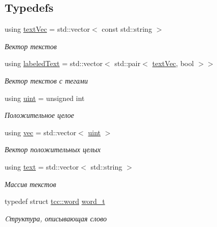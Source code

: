 \subsection*{Typedefs}
\begin{DoxyCompactItemize}
\item 
using \hyperlink{namespacetcc_a9bdf9e81347b7904a6a7f8427d6465dc}{text\+Vec} = std\+::vector$<$ const std\+::string $>$\hypertarget{namespacetcc_a9bdf9e81347b7904a6a7f8427d6465dc}{}\label{namespacetcc_a9bdf9e81347b7904a6a7f8427d6465dc}

\begin{DoxyCompactList}\small\item\em Вектор текстов \end{DoxyCompactList}\item 
using \hyperlink{namespacetcc_a9822983deb4f2a8719352b3c1c55d69a}{labeled\+Text} = std\+::vector$<$ std\+::pair$<$ \hyperlink{namespacetcc_a9bdf9e81347b7904a6a7f8427d6465dc}{text\+Vec}, bool $>$$>$\hypertarget{namespacetcc_a9822983deb4f2a8719352b3c1c55d69a}{}\label{namespacetcc_a9822983deb4f2a8719352b3c1c55d69a}

\begin{DoxyCompactList}\small\item\em Вектор текстов с тегами \end{DoxyCompactList}\item 
using \hyperlink{group__aliases_gae00908f082db728f73e52c3b4932261a}{uint} = unsigned int
\begin{DoxyCompactList}\small\item\em Положительное целое \end{DoxyCompactList}\item 
using \hyperlink{group__aliases_ga33d75c4fd4f8d49a28f246c2e0a0f3a5}{vec} = std\+::vector$<$ \hyperlink{group__aliases_gae00908f082db728f73e52c3b4932261a}{uint} $>$
\begin{DoxyCompactList}\small\item\em Вектор положительных целых \end{DoxyCompactList}\item 
using \hyperlink{group__aliases_ga085c5ca5bf5645ff17c0ede30f56b08f}{text} = std\+::vector$<$ std\+::string $>$
\begin{DoxyCompactList}\small\item\em Массив текстов \end{DoxyCompactList}\item 
typedef struct \hyperlink{structtcc_1_1word}{tcc\+::word} \hyperlink{namespacetcc_a310a95f44f9f0b3198b9758732eba6b9}{word\+\_\+t}\hypertarget{namespacetcc_a310a95f44f9f0b3198b9758732eba6b9}{}\label{namespacetcc_a310a95f44f9f0b3198b9758732eba6b9}

\begin{DoxyCompactList}\small\item\em Cтруктура, описывающая слово \end{DoxyCompactList}\end{DoxyCompactItemize}
